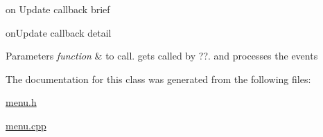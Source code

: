 on Update callback brief 

on\-Update callback detail 
\begin{DoxyParams}{Parameters}
{\em function} & to call. gets called by ??. and processes the events \\
\hline
\end{DoxyParams}


The documentation for this class was generated from the following files\-:\begin{DoxyCompactItemize}
\item 
\hyperlink{menu_8h}{menu.\-h}\item 
\hyperlink{menu_8cpp}{menu.\-cpp}\end{DoxyCompactItemize}
